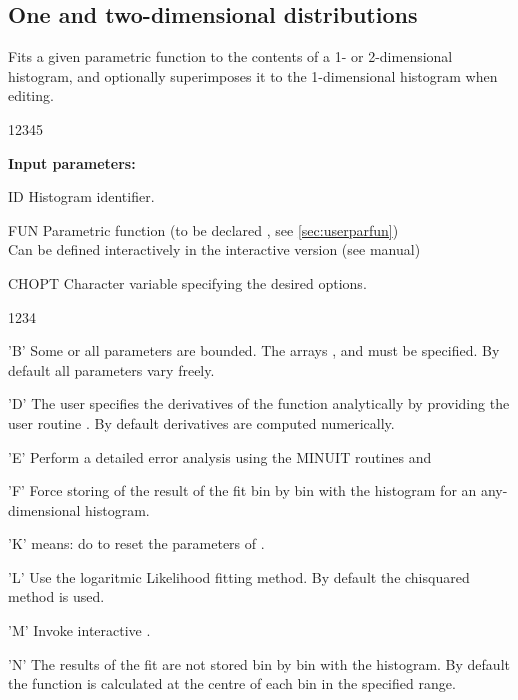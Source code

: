 \newpage
\subsection{One and two-dimensional distributions}

 
\Action
Fits a given parametric function to the contents of a
1- or 2-dimensional histogram, and optionally superimposes
it to the 1-dimensional histogram when editing.
 
\begin{DLtt}{12345}
\item[{\rm\bf Input parameters:}]
\item[ID] Histogram identifier.
\item[FUN] Parametric function (to be declared ,
           see \ref{sec:userparfun})           \\
           Can be defined interactively in the interactive version 
           (see \PAW{} manual)
\item[CHOPT] Character variable specifying the desired options.
\begin{DLtt}{1234}
\item['B'] Some or all parameters are bounded.
           The arrays ,  and 
           must be specified.
           By default all parameters vary freely.
\item['D'] The user specifies the derivatives of the function
           analytically by providing the user routine .
           By default derivatives are computed numerically.
\item['E'] Perform a detailed error analysis using the MINUIT routines
            and 
\item['F'] Force storing of the result of the fit bin by bin with the
           histogram for an any-dimensional histogram.
\item['K']  means: do to reset the parameters of 
           .
\item['L'] Use the logaritmic Likelihood fitting method.
           By default the chisquared method is used.
\item['M'] Invoke interactive .
\item['N'] The results of the fit are not stored
           bin by bin with the histogram.
           By default the function is calculated at the centre of each bin
           in the specified range.

\end{DLtt}
\end{DLtt}
